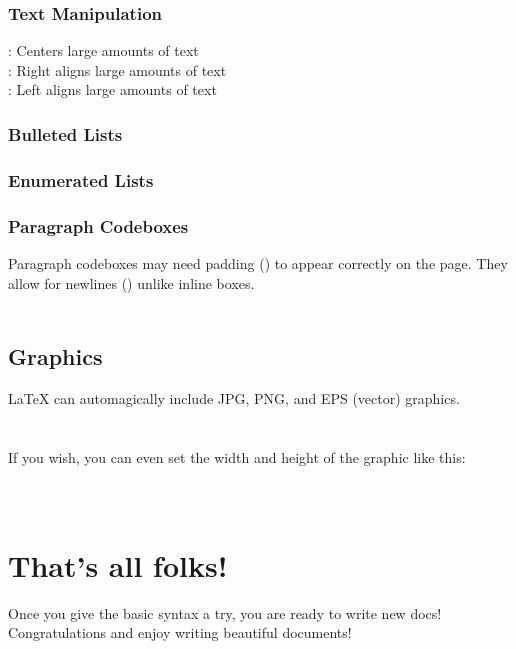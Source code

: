 \subsubsection{Text Manipulation}
: Centers large amounts of text\\
: Right aligns large amounts of text\\
: Left aligns large amounts of text
\subsubsection{Bulleted Lists}
\subsubsection{Enumerated Lists}
\subsubsection{Paragraph Codeboxes}
Paragraph codeboxes may need padding (\code{\sla\sla\sla\sla}) to appear correctly on the page.  They allow for newlines (\code{\sla\sla}) unlike inline  boxes.
\\\\

\subsection{Graphics}
\LaTeX{} can automagically include JPG, PNG, and EPS (vector) graphics.\\
\\\\
If you wish, you can even set the width and height of the graphic like this:\\
\\\\

\section{That's all folks!}
Once you give the basic syntax a try, you are ready to write new docs!\\Congratulations and enjoy writing beautiful documents!

